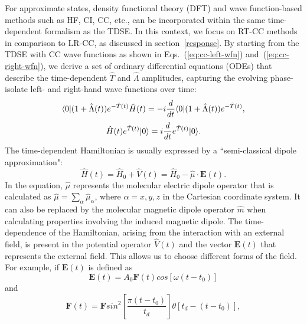 For approximate states, density functional theory (DFT) and wave function-based methods such as HF,\cite{Beck2000, Li2005, Kvaal2011} CI,\cite{Klamroth2003, Krause2005, Krause2007} CC,\cite{Kvaal2012, Nascimento2016, Nascimento2017, Pedersen2019, Kristiansen2020, Ofstad2023, Hauge2023, Park2019, Park2021} etc., can be incorporated within the same time-dependent formalism as the TDSE. In this context, we focus on RT-CC methods in comparison to LR-CC, as discussed in section~\ref{response}. By starting from the TDSE with CC wave functions as shown in Eqs.~(\ref{eq:cc-left-wfn}) and~(\ref{eq:cc-right-wfn}), we derive a set of ordinary differential equations (ODEs) that describe the time-dependent $\hat{T}$ and $\hat{\Lambda}$ amplitudes, capturing the evolving phase-isolate left- and right-hand wave functions over time:
\begin{equation}
\langle0 |(1 + \hat{\Lambda}(t))e^{-\hat{T}(t)}\hat{H}(t) = -i\frac{d}{dt}\langle0 |(1 + \hat{\Lambda}(t))e^{-\hat{T}(t)},
\label{eq:rt-left-wfn}
\end{equation}
\begin{equation}
\hat{H}(t)e^{\hat{T}(t)}| 0 \rangle=i\frac{d}{dt}e^{\hat{T}(t)}| 0 \rangle.
\label{eq:rt-right-wfn}
\end{equation}
The time-dependent Hamiltonian is usually expressed by a ``semi-classical dipole approximation":
\begin{equation}
\hat{H}(t) = \hat{H}_{0} + \hat{V}(t) = \hat{H}_{0} - \hat{\mu} \cdot \textbf{E}(t).
\end{equation}
In the equation, $\hat{\mu}$ represents the molecular electric dipole operator that is calculated as $\hat{\mu}=\sum_{\alpha}\hat{\mu}_{\alpha}$, where $\alpha=x, y, z$ in the Cartesian coordinate system. It can also be replaced by the molecular magnetic dipole operator $\hat{m}$ when calculating properties involving the induced magnetic dipole. The time-dependence of the Hamiltonian, arising from the interaction with an external field, is present in the potential operator $\hat{V}(t)$ and the vector $\textbf{E}(t)$ that represents the external field. This allows us to choose different forms of the field. For example, if $\textbf{E}(t)$ is defined as
\begin{equation}
\textbf{E}(t) = A_{0}\textbf{F}(t)cos[\omega(t-t_{0})]
\end{equation}
and
\begin{equation}
\textbf{F}(t) = \textbf{F}sin^{2}[\frac{\pi(t-t_{0})}{t_{d}}]\theta[t_{d} - (t - t_{0})], 
\end{equation}
